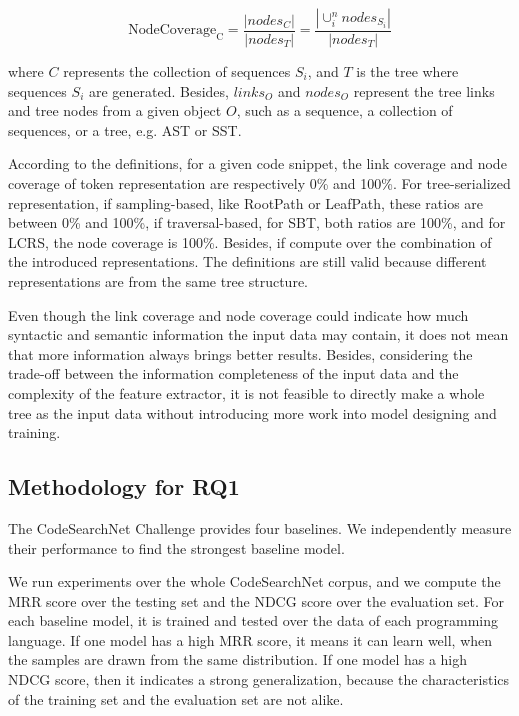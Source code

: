 \documentclass[conference]{IEEEtran}
\begin{document}
\begin{equation}\mathrm{NodeCoverage}_{\mathrm{C}}=\frac{\left|nodes_{C}\right|}{\left|nodes_{T}\right|}=\frac{\left|\cup_{i}^{n}{nodes_{S_i}}\right|}{\left|nodes_{T}\right|}\end{equation}

where $C$ represents the collection of sequences $S_{i}$, and $T$ is the tree where sequences $S_{i}$ are generated. Besides, $links_{O}$ and $nodes_{O}$ represent the tree links and tree nodes from a given object $O$, such as a sequence, a collection of sequences, or a tree, e.g. AST or SST.

According to the definitions, for a given code snippet, the link coverage and node coverage of token representation are respectively 0\% and 100\%. For tree-serialized representation, if sampling-based, like RootPath or LeafPath, these ratios are between 0\% and 100\%, if traversal-based, for SBT, both ratios are 100\%, and for LCRS, the node coverage is 100\%. Besides, if compute over the combination of the introduced representations. The definitions are still valid because different representations are from the same tree structure.

Even though the link coverage and node coverage could indicate how much syntactic and semantic information the input data may contain, it does not mean that more information always brings better results. Besides, considering the trade-off between the information completeness of the input data and the complexity of the feature extractor, it is not feasible to directly make a whole tree as the input data without introducing more work into model designing and training.

\subsection{Methodology for RQ1}
\label{subsec:mrq1}

\emph{\rqaaa}

The CodeSearchNet Challenge provides four baselines. We independently measure their performance to find the strongest baseline model.

We run experiments over the whole CodeSearchNet corpus, and we compute the MRR score over the testing set and the NDCG score over the evaluation set. For each baseline model, it is trained and tested over the data of each programming language. If one model has a high MRR score, it means it can learn well, when the samples are drawn from the same distribution. If one model has a high NDCG score, then it indicates a strong generalization, because the characteristics of the training set and the evaluation set are not alike.
\end{document}
